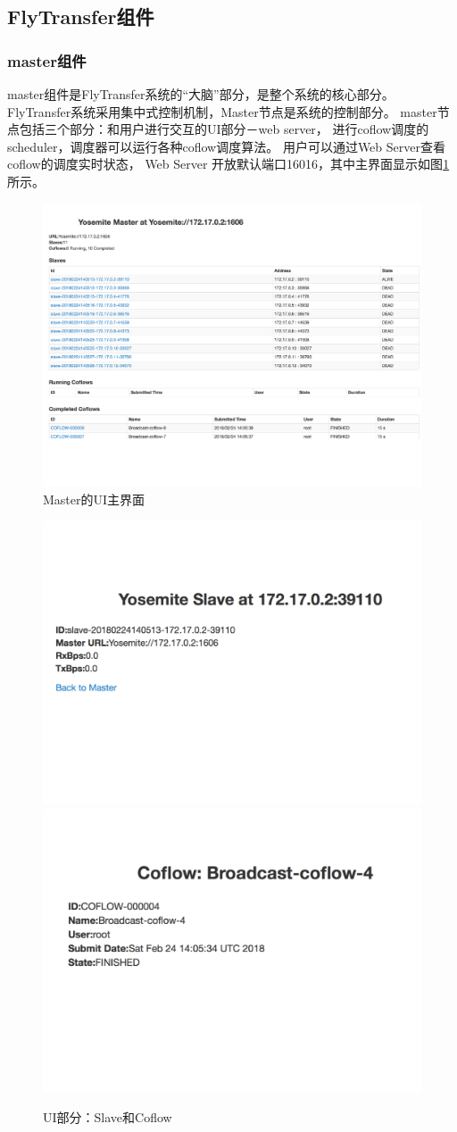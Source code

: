 \subsection{FlyTransfer组件}
\subsubsection{master组件}
master组件是FlyTransfer系统的“大脑”部分，是整个系统的核心部分。
FlyTransfer系统采用集中式控制机制，Master节点是系统的控制部分。
master节点包括三个部分：和用户进行交互的UI部分－web server，
进行coflow调度的scheduler，调度器可以运行各种coflow调度算法。
用户可以通过Web Server查看coflow的调度实时状态，
Web Server 开放默认端口16016，其中主界面显示如图\ref{Yosemite-Master-fig}所示。
\begin{figure}[b]
\begin{center}
\includegraphics [width=0.8\columnwidth] {figures/Yosemite/figs/system/YosmiteMaster.pdf}
\caption{Master的UI主界面}
\label{Yosemite-Master-fig}
\end{center}
\end{figure}
\begin{figure}[h]
\centering
{}
 {\includegraphics[width=0.48\columnwidth]{figures/Yosemite/figs/system/YosemiteSlave.pdf}}
{\includegraphics[width=0.48\columnwidth]{figures/Yosemite/figs/system/YosemiteCoflow.pdf}}
\caption{UI部分：Slave和Coflow}
\label{Yosemite-Salve-Coflow-fig}
\end{figure}

